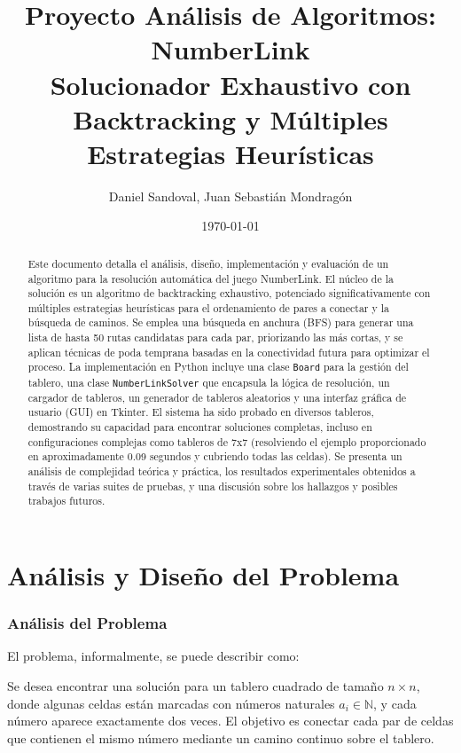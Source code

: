 \documentclass[spanish]{article}
\numberwithin{equation}{section}
\numberwithin{figure}{section}
\theoremstyle{definition}
\begin{document}
\title{Proyecto Análisis de Algoritmos: NumberLink\\
\large Solucionador Exhaustivo con Backtracking y Múltiples Estrategias Heurísticas}
\author{Daniel Sandoval, Juan Sebastián Mondragón}
\date{\today}
\maketitle

\begin{abstract}
\RaggedRight
Este documento detalla el análisis, diseño, implementación y evaluación de un algoritmo para la resolución automática del juego NumberLink. El núcleo de la solución es un algoritmo de backtracking exhaustivo, potenciado significativamente con múltiples estrategias heurísticas para el ordenamiento de pares a conectar y la búsqueda de caminos. Se emplea una búsqueda en anchura (BFS) para generar una lista de hasta 50 rutas candidatas para cada par, priorizando las más cortas, y se aplican técnicas de poda temprana basadas en la conectividad futura para optimizar el proceso. La implementación en Python incluye una clase \texttt{Board} para la gestión del tablero, una clase \texttt{NumberLinkSolver} que encapsula la lógica de resolución, un cargador de tableros, un generador de tableros aleatorios y una interfaz gráfica de usuario (GUI) en Tkinter. El sistema ha sido probado en diversos tableros, demostrando su capacidad para encontrar soluciones completas, incluso en configuraciones complejas como tableros de 7x7 (resolviendo el ejemplo proporcionado en aproximadamente 0.09 segundos y cubriendo todas las celdas). Se presenta un análisis de complejidad teórica y práctica, los resultados experimentales obtenidos a través de varias suites de pruebas, y una discusión sobre los hallazgos y posibles trabajos futuros.
\end{abstract}

\part{Análisis y Diseño del Problema}

\section{Análisis del Problema}
El problema, informalmente, se puede describir como:

Se desea encontrar una solución para un tablero cuadrado de tamaño $n \times n$, donde algunas celdas están marcadas con números naturales $a_i \in \mathbb{N}$, y cada número aparece exactamente dos veces. El objetivo es conectar cada par de celdas que contienen el mismo número mediante un camino continuo sobre el tablero.
\end{document}
